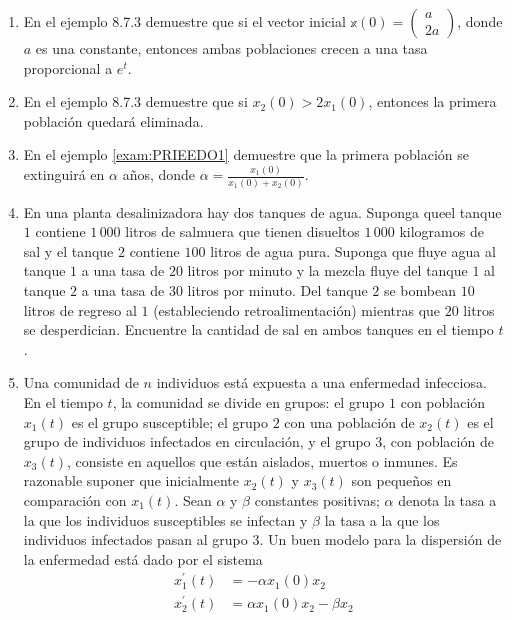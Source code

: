 \begin{enumerate}[start=227]
    \item En el ejemplo 8.7.3 demuestre que si el vector inicial $\mathbb{x}(0)=\begin{pmatrix} a \\ 2 a \end{pmatrix}$, donde $a$ es una constante, entonces ambas poblaciones crecen a una tasa proporcional a $e^{t}$.
    \item En el ejemplo 8.7.3 demuestre que si $x_{2}(0)>2 x_{1}(0)$, entonces la primera población quedará eliminada.
    \item En el ejemplo \ref{exam:PRIEEDO1} demuestre que la primera población se extinguirá en $\alpha$ años, donde $\displaystyle\alpha=\frac{x_{1}(0)}{x_{1}(0)+x_{2}(0)}$.
    \item En una planta desalinizadora hay dos tanques de agua. Suponga queel tanque $1$ contiene $1 \, 000$ litros de salmuera que tienen disueltos $1 \, 000$ kilogramos de sal y el tanque $2$ contiene $100$ litros de agua pura. Suponga que fluye agua al tanque $1$ a una tasa de $20$ litros por minuto y la mezcla fluye del tanque $1$ al tanque $2$ a una tasa de $30$ litros por minuto. Del tanque $2$ se bombean $10$ litros de regreso al $1$ (estableciendo retroalimentación) mientras que $20$ litros se desperdician. Encuentre la cantidad de sal en ambos tanques en el tiempo $t$.\newpage
    \item Una comunidad de $n$ individuos está expuesta a una enfermedad infecciosa. En el tiempo $t$, la comunidad se divide en grupos: el grupo $1$ con población $x_{1}(t)$ es el grupo susceptible; el grupo $2$ con una población de $x_{2}(t)$ es el grupo de individuos infectados en circulación, y el grupo $3$, con población de $x_{3}(t)$, consiste en aquellos que están aislados, muertos o inmunes. Es razonable suponer que inicialmente $x_{2}(t)$ y $x_{3}(t)$ son pequeños en comparación con $x_{1}(t)$. Sean $\alpha$ y $\beta$ constantes positivas; $\alpha$ denota la tasa a la que los individuos susceptibles se infectan y $\beta$ la tasa a la que los individuos infectados pasan al grupo $3$. Un buen modelo para la dispersión de la enfermedad está dado por el sistema
    \begin{align*}
        x_{1}^{\prime}(t) & = -\alpha x_{1}(0) x_{2} \\
        x_{2}^{\prime}(t) & = \alpha x_{1}(0) x_{2}-\beta x_{2} \\

\end{align*}
\end{enumerate}
